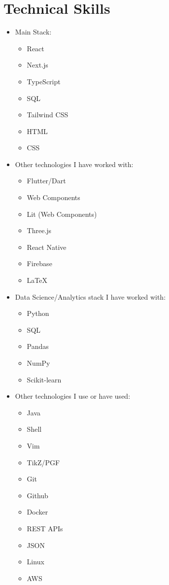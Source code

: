 \documentclass[14pt]{extarticle}
\renewcommand{\_}{\leavevmode\kern.06em\vbox{\hrule width.425em}}
\begin{document}
\section{Technical Skills}

\begin{itemize}
  \item Main Stack: 
    \begin{itemize}
      \item React
      \item Next.js
      \item TypeScript
      \item SQL
      \item Tailwind CSS
      \item HTML
      \item CSS
    \end{itemize}
    
  \item Other technologies I have worked with:
    \begin{itemize}
      \item Flutter/Dart
      \item Web Components
      \item Lit (Web Components)
      \item Three.js
      \item React Native
      \item Firebase
      \item \LaTeX
    \end{itemize}
  \item Data Science/Analytics stack I have worked with:
    \begin{itemize}
      \item Python
      \item SQL
      \item Pandas
      \item NumPy
      \item Scikit-learn
    \end{itemize}
  \item Other technologies I use or have used:
    \begin{itemize}
      \item Java
      \item Shell
      \item Vim
      \item TikZ/PGF
      \item Git
      \item Github
      \item Docker
      \item REST APIs
      \item JSON
      \item Linux
      \item AWS
    \end{itemize}
\end{itemize}
\end{document}
